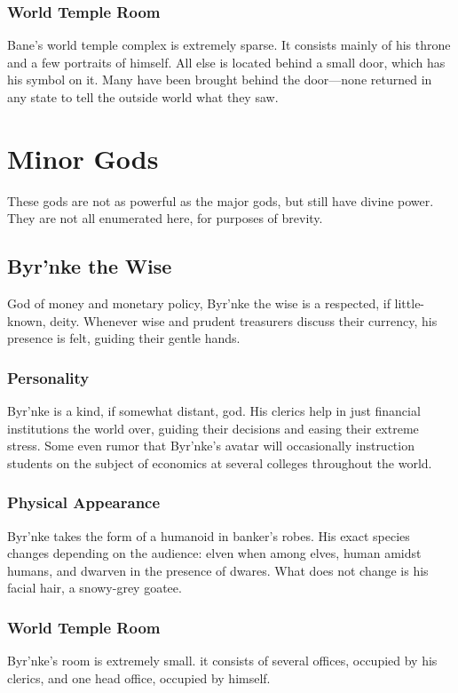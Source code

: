 \begin{multicols}{2}
\subsubsection*{World Temple Room}
Bane's world temple complex is extremely sparse.
It consists mainly of his throne and a few portraits of himself.
All else is located behind a small door, which has his symbol on it.
Many have been brought behind the door---none returned in any state to tell the outside world what they saw.

\section{Minor Gods}
These gods are not as powerful as the major gods, but still have divine power.
They are not all enumerated here, for purposes of brevity.

\subsection*{Byr'nke the Wise}
\begin{goddesc}
\end{goddesc}
God of money and monetary policy, Byr'nke the wise is a respected, if little-known, deity.
Whenever wise and prudent treasurers discuss their currency, his presence is felt, guiding their gentle hands.

\subsubsection*{Personality}
Byr'nke is a kind, if somewhat distant, god.
His clerics help in just financial institutions the world over, guiding their decisions and easing their extreme stress.
Some even rumor that Byr'nke's avatar will occasionally instruction students on the subject of economics at several colleges throughout the world.

\subsubsection*{Physical Appearance}
Byr'nke takes the form of a humanoid in banker's robes.
His exact species changes depending on the audience: elven when among elves, human amidst humans, and dwarven in the presence of dwares.
What does not change is his facial hair, a snowy-grey goatee.

\subsubsection*{World Temple Room}
Byr'nke's room is extremely small.
it consists of several offices, occupied by his clerics, and one head office, occupied by himself.

\end{multicols}